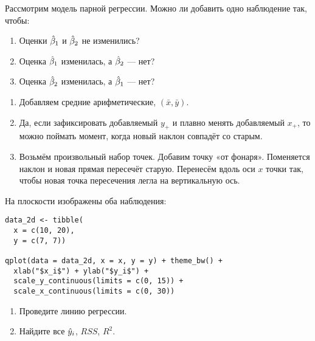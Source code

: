 \begin{problem}
Рассмотрим модель парной регрессии. Можно ли добавить одно наблюдение так, чтобы:
\begin{enumerate}
\item Оценки $\hb_1$ и $\hb_2$ не изменились?
\item Оценка $\hb_1$ изменилась, а $\hb_2$ — нет?
\item Оценка $\hb_2$ изменилась, а $\hb_1$ — нет?
\end{enumerate}

\begin{sol}
  \begin{enumerate}
  \item Добавляем средние арифметические, $(\bar x, \bar y)$.
  \item Да, если зафиксировать добавляемый $y_{+}$ и плавно менять добавляемый $x_{+}$, то можно поймать момент, когда новый наклон совпадёт со старым.
  \item Возьмём произвольный набор точек. Добавим точку «от фонаря». Поменяется наклон и новая прямая пересечёт старую. Перенесём вдоль оси $x$ точки так, чтобы новая точка пересечения легла на вертикальную ось.
  \end{enumerate}
\end{sol}
\end{problem}

\begin{problem}
На плоскости изображены оба наблюдения:

\begin{verbatim}
data_2d <- tibble(
  x = c(10, 20),
  y = c(7, 7))

qplot(data = data_2d, x = x, y = y) + theme_bw() +
  xlab("$x_i$") + ylab("$y_i$") +
  scale_y_continuous(limits = c(0, 15)) +
  scale_x_continuous(limits = c(0, 30))
\end{verbatim}



\begin{minipage}{0.6\textwidth}
\begin{center}
\begin{tikzpicture}[scale = 0.025]

\end{tikzpicture}
\end{center}
\end{minipage}

\begin{enumerate}
\item Проведите линию регрессии.
\item Найдите все $\hy_i$, $RSS$, $R^2$.
\end{enumerate}

\begin{sol}
\end{sol}
\end{problem}

